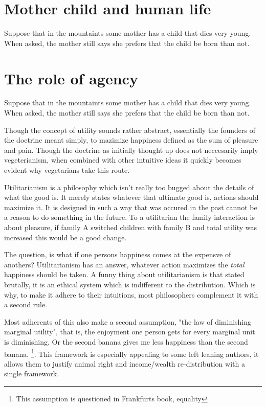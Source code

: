 \documentclass[12pt]{report}
\numberwithin{equation}{section}
\begin{document}
\section{Mother child and human life}

Suppose that in the mountaints some mother has a child that dies very young. When asked, the mother still says she prefers that the child be born than not. 

\section{The role of agency}

Suppose that in the mountaints some mother has a child that dies very young. When asked, the mother still says she prefers that the child be born than not. 








Though the concept of utility sounds rather abstract, essentially the founders of the doctrine meant simply, to mazimize happiness defined as the sum of pleasure and pain. Though the doctrine as initially thought up does not neccesarily imply vegeterianism, when combined with other intuitive ideas it quickly becomes evident why vegetarians take this route. 

Utilitarianism is a philosophy which isn't really too bugged about the details of what the good is. It merely states whatever that ultimate good is, actions should maximize it. It is designed in such a way that was occured in the past cannot be a reason to do something in the future.  To a utilitarian the family interaction is about pleasure, if family A switched children with family B and total utility was increased this would be a good change. 

The question, is what if one persons happiness comes at the expensve of anothers? Utilitarianism has an answer, whatever action maximizes the \textit{total} happiness should be taken. A funny thing about utilitarianism is that stated brutally, it is an ethical system which is indifferent to the distribution. Which is why, to make it adhere to their intuitions, most philosophers complement it with a second rule. 

Most adherents of this also make a second assumption, "the law of diminishing marginal utility", that is, the enjoyment one person gets for every marginal unit is diminishing. Or the second banana gives me less happiness than the second banana. \footnote{This assumption is questioned in Frankfurts book, equality}. This framework is especially appealing to some left leaning authors, it allows them to justify animal right and income/wealth re-distribution with a single framework. 
\end{document}

